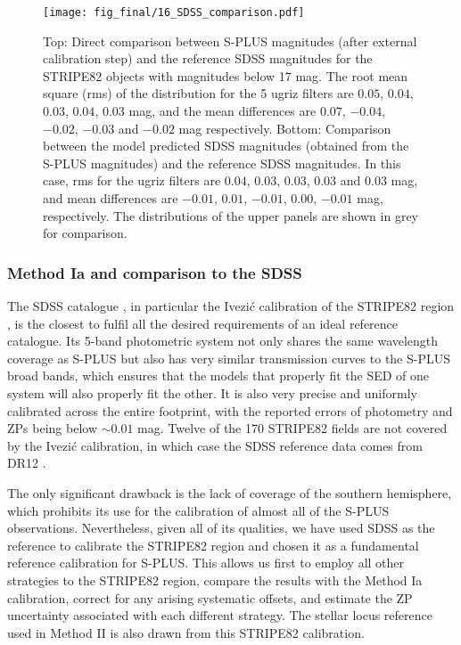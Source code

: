 \documentclass[fleqn,usenatbib]{mnras}
\begin{document}
\begin{figure*}
\begin{center}
\texttt{[image: fig\_final/16\_SDSS\_comparison.pdf]}
\caption{\label{fig:SPLUS_SDSS_comparison} Top: Direct comparison between S-PLUS magnitudes (after external calibration step) and the reference SDSS magnitudes for the STRIPE82 objects with magnitudes below 17 mag. The root mean square (rms) of the distribution for the 5 ugriz filters are $0.05$, $0.04$, $0.03$, $0.04$, $0.03$ mag, and the mean differences are $0.07$, $-0.04$, $-0.02$, $-0.03$ and $-0.02$ mag respectively. Bottom: Comparison between the model predicted SDSS magnitudes (obtained from the S-PLUS magnitudes) and the reference SDSS magnitudes. In this case, rms for the ugriz filters are $0.04$, $0.03$, $0.03$, $0.03$ and $0.03$ mag, and mean differences are $-0.01$, $0.01$, $-0.01$, $0.00$, $-0.01$ mag, respectively. The distributions of the upper panels are shown in grey for comparison.}
\end{center}
\end{figure*}

\subsubsection{Method Ia and comparison to the SDSS}

The SDSS catalogue \citep{York+2000}, in particular the Ivezi{\'c} calibration of the STRIPE82 region \citep{Ivezic+2007}, is the closest to fulfil all the desired requirements of an ideal reference catalogue. Its 5-band photometric system \citep{Doi+2010} not only shares the same wavelength coverage as S-PLUS but also has very similar transmission curves to the S-PLUS broad bands, which ensures that the models that properly fit the SED of one system will also properly fit the other. It is also very precise and uniformly calibrated across the entire footprint, with the reported errors of photometry and ZPs being below $\sim0.01$ mag. Twelve of the 170 STRIPE82 fields are not covered by the Ivezi{\'c} calibration, in which case the SDSS reference data comes from DR12 \citep{Alam+15}.

The only significant drawback is the lack of coverage of the southern hemisphere, which prohibits its use for the calibration of almost all of the S-PLUS observations. Nevertheless, given all of its qualities, we have used SDSS as the reference to calibrate the STRIPE82 region and chosen it as a fundamental reference calibration for S-PLUS. This allows us first to employ all other strategies to the STRIPE82 region, compare the results with the Method Ia calibration, correct for any arising systematic offsets, and estimate the ZP uncertainty associated with each different strategy. The stellar locus reference used in Method II is also drawn from this STRIPE82 calibration.
\end{document}
